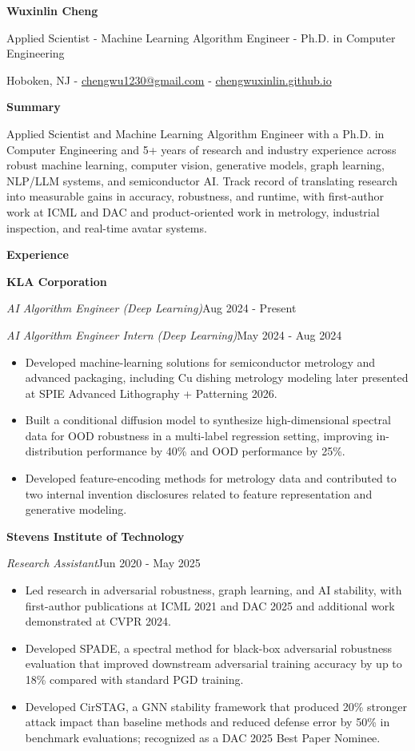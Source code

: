 \documentclass[11pt]{article}
\newcommand{\sectiontitle}[1]{%
  \vspace{10pt}%
  {\large\sffamily\bfseries\color{heading} #1}\par
  \vspace{3pt}{\color{heading!55}\hrule}\vspace{6pt}
}
\newcommand{\company}[1]{\textbf{#1}\par}
\newcommand{\role}[2]{\emph{#1}\hfill{\small #2}\par}
\newcommand{\entryspace}{\vspace{5pt}}
\begin{document}
\fontsize{10.6}{13}\selectfont

{\fontsize{24}{27}\selectfont\bfseries Wuxinlin Cheng}\par
\vspace{2pt}
{\sffamily\color{muted} Applied Scientist - Machine Learning Algorithm Engineer - Ph.D. in Computer Engineering}\par
\vspace{3pt}
{\sffamily\small Hoboken, NJ - \href{mailto:chengwu1230@gmail.com}{chengwu1230@gmail.com} - \href{https://chengwuxinlin.github.io}{chengwuxinlin.github.io}}\par

\sectiontitle{Summary}
Applied Scientist and Machine Learning Algorithm Engineer with a Ph.D. in Computer Engineering and 5+ years of research and industry experience across robust machine learning, computer vision, generative models, graph learning, NLP/LLM systems, and semiconductor AI. Track record of translating research into measurable gains in accuracy, robustness, and runtime, with first-author work at ICML and DAC and product-oriented work in metrology, industrial inspection, and real-time avatar systems.

\sectiontitle{Experience}

\company{KLA Corporation}
\role{AI Algorithm Engineer (Deep Learning)}{Aug 2024 - Present}
\role{AI Algorithm Engineer Intern (Deep Learning)}{May 2024 - Aug 2024}
\begin{itemize}
    \item Developed machine-learning solutions for semiconductor metrology and advanced packaging, including Cu dishing metrology modeling later presented at SPIE Advanced Lithography + Patterning 2026.
    \item Built a conditional diffusion model to synthesize high-dimensional spectral data for OOD robustness in a multi-label regression setting, improving in-distribution performance by 40\% and OOD performance by 25\%.
    \item Developed feature-encoding methods for metrology data and contributed to two internal invention disclosures related to feature representation and generative modeling.
\end{itemize}

\entryspace
\company{Stevens Institute of Technology}
\role{Research Assistant}{Jun 2020 - May 2025}
\begin{itemize}
    \item Led research in adversarial robustness, graph learning, and AI stability, with first-author publications at ICML 2021 and DAC 2025 and additional work demonstrated at CVPR 2024.
    \item Developed SPADE, a spectral method for black-box adversarial robustness evaluation that improved downstream adversarial training accuracy by up to 18\% compared with standard PGD training.
    \item Developed CirSTAG, a GNN stability framework that produced 20\% stronger attack impact than baseline methods and reduced defense error by 50\% in benchmark evaluations; recognized as a DAC 2025 Best Paper Nominee.
\end{itemize}
\end{document}
